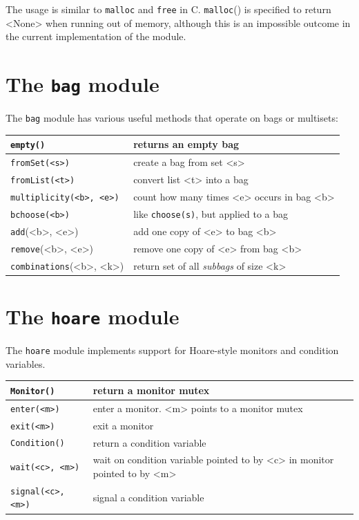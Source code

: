 \documentclass{report}
\begin{document}
The usage is similar to \texttt{malloc} and \texttt{free} in C.
\texttt{malloc}() is specified to return <{None}> when running out of
memory, although this is an impossible outcome in the current
implementation of the module.

\section{The \texttt{bag} module}
\label{ap:bag}

The \texttt{bag} module
%
has various useful methods that operate on bags or
multisets:

\vspace{1em}
\begin{tabular}{|l|l|}
\hline
\texttt{empty()} & returns an empty bag\\
\hline
\texttt{fromSet(<{s}>)} & create a bag from set <{s}>\\
\hline
\texttt{fromList(<{t}>)} & convert list <{t}> into a bag \\
\hline
\texttt{multiplicity(<{b}>, <{e}>)} & count how many times <{e}> occurs in bag <{b}>\\
\hline
\texttt{bchoose(<{b}>)} & like \texttt{choose(s)}, but applied to a bag\\
\hline
\texttt{add}(<{b}>, <{e}>) & add one copy of <{e}> to bag <{b}> \\
\hline
\texttt{remove}(<{b}>, <{e}>) & remove one copy of <{e}> from bag <{b}> \\
\hline
\texttt{combinations}(<{b}>, <{k}>) & return set of all \emph{subbags} of size <{k}> \\
\hline
\end{tabular}

\section{The \texttt{hoare} module}
\label{ap:hoare}

%
The \texttt{hoare} module implements support for Hoare-style monitors
and condition variables.

\vspace{1em}
\begin{tabular}{|l|l|}
\hline
\texttt{Monitor()} & return a monitor mutex\\
\hline
\texttt{enter(<{m}>)} & enter a monitor.  <{m}> points to a monitor mutex\\
\hline
\texttt{exit(<{m}>)} & exit a monitor\\
\hline
\texttt{Condition()} & return a condition variable\\
\hline
\texttt{wait(<{c}>, <{m}>)} & wait on condition variable pointed to by <{c}> in monitor pointed to by <{m}>\\
\hline
\texttt{signal(<{c}>, <{m}>)} & signal a condition variable\\
\hline
\end{tabular}
\end{document}
